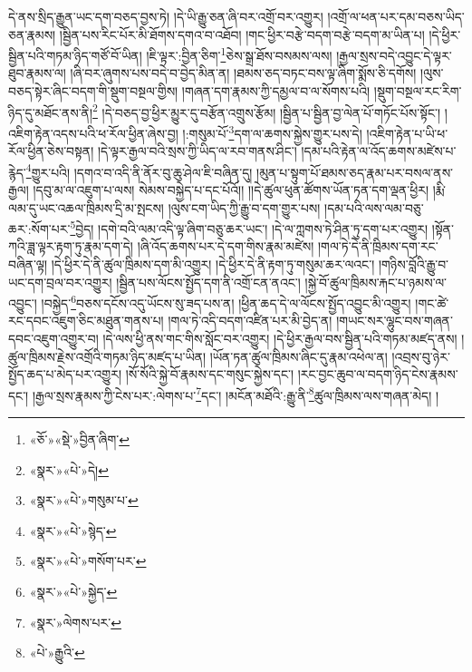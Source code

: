 དེ་ནས་སྲིད་རྒྱུན་ཡང་དག་བཅད་བྱས་ཏེ། །དེ་ཡི་རྒྱུ་ཅན་ཞི་བར་འགྲོ་བར་འགྱུར། །འགྲོ་ལ་ཕན་པར་དམ་བཅས་ཡིད་ཅན་རྣམས། །སྦྱིན་པས་རིང་པོར་མི་ཐོགས་དགའ་བ་འཐོབ། །གང་ཕྱིར་བརྩེ་བདག་བརྩེ་བདག་མ་ཡིན་པ། །དེ་ཕྱིར་སྦྱིན་པའི་གཏམ་ཉིད་གཙོ་བོ་ཡིན། །ཇི་ལྟར་:བྱིན་ཅིག་\footnote{«ཅོ་»«སྡེ་»བྱིན་ཞིག་}ཅེས་སྒྲ་ཐོས་བསམས་ལས། །རྒྱལ་སྲས་བདེ་འབྱུང་དེ་ལྟར་ཐུབ་རྣམས་ལ། །ཞི་བར་ཞུགས་པས་བདེ་བ་བྱེད་མིན་ན། །ཐམས་ཅད་བཏང་བས་ལྟ་ཞིག་སྨོས་ཅི་དགོས། །ལུས་བཅད་སྟེར་ཞིང་བདག་གི་སྡུག་བསྔལ་གྱིས། །གཞན་དག་རྣམས་ཀྱི་དམྱལ་བ་ལ་སོགས་པའི། །སྡུག་བསྔལ་རང་རིག་ཉིད་དུ་མཐོང་ནས་ནི།\footnote{«སྣར་»«པེ་»དེ།} །དེ་བཅད་བྱ་ཕྱིར་མྱུར་དུ་བརྩོན་འགྲུས་རྩོམ། །སྦྱིན་པ་སྦྱིན་བྱ་ལེན་པོ་གཏོང་པོས་སྟོང་། །འཇིག་རྟེན་འདས་པའི་ཕ་རོལ་ཕྱིན་ཞེས་བྱ། །:གསུམ་པོ་\footnote{«སྣར་»«པེ་»གསུམ་པ་}དག་ལ་ཆགས་སྐྱེས་གྱུར་པས་དེ། །འཇིག་རྟེན་པ་ཡི་ཕ་རོལ་ཕྱིན་ཅེས་བསྟན། །དེ་ལྟར་རྒྱལ་བའི་སྲས་ཀྱི་ཡིད་ལ་རབ་གནས་ཤིང་། །དམ་པའི་རྟེན་ལ་འོད་ཆགས་མཛེས་པ་རྙེད་\footnote{«སྣར་»«པེ་»སྙེད་}གྱུར་པའི། །དགའ་བ་འདི་ནི་ནོར་བུ་ཆུ་ཤེལ་ཇི་བཞིན་དུ། །མུན་པ་སྟུག་པོ་ཐམས་ཅད་རྣམ་པར་བསལ་ནས་རྒྱལ། །དབུ་མ་ལ་འཇུག་པ་ལས། སེམས་བསྐྱེད་པ་དང་པོའོ།། །།དེ་ཚུལ་ཕུན་ཚོགས་ཡོན་ཏན་དག་ལྡན་ཕྱིར། །རྨི་ལམ་དུ་ཡང་འཆལ་ཁྲིམས་དྲི་མ་སྤངས། །ལུས་ངག་ཡིད་ཀྱི་རྒྱུ་བ་དག་གྱུར་པས། །དམ་པའི་ལས་ལམ་བཅུ་ཆར་:སོག་པར་\footnote{«སྣར་»«པེ་»གསོག་པར་}བྱེད། །དགེ་བའི་ལམ་འདི་ལྟ་ཞིག་བཅུ་ཆར་ཡང་། །དེ་ལ་ཀླགས་ཏེ་ཤིན་ཏུ་དག་པར་འགྱུར། །སྟོན་ཀའི་ཟླ་ལྟར་རྟག་ཏུ་རྣམ་དག་དེ། །ཞི་འོད་ཆགས་པར་དེ་དག་གིས་རྣམ་མཛེས། །གལ་ཏེ་དེ་ནི་ཁྲིམས་དག་རང་བཞིན་ལྟ། །དེ་ཕྱིར་དེ་ནི་ཚུལ་ཁྲིམས་དག་མི་འགྱུར། །དེ་ཕྱིར་དེ་ནི་རྟག་ཏུ་གསུམ་ཆར་ལའང་། །གཉིས་བློའི་རྒྱུ་བ་ཡང་དག་བྲལ་བར་འགྱུར། །སྦྱིན་པས་ལོངས་སྤྱོད་དག་ནི་འགྲོ་ངན་ནའང་། །སྐྱེ་བོ་ཚུལ་ཁྲིམས་རྐང་པ་ཉམས་ལ་འབྱུང་། །བསྐྱེད་\footnote{«སྣར་»«པེ་»སྐྱེད་}བཅས་དངོས་འདུ་ཡོངས་སུ་ཟད་པས་ན། །ཕྱིན་ཆད་དེ་ལ་ལོངས་སྤྱོད་འབྱུང་མི་འགྱུར། །གང་ཚེ་རང་དབང་འཇུག་ཅིང་མཐུན་གནས་པ། །གལ་ཏེ་འདི་བདག་འཛིན་པར་མི་བྱེད་ན། །གཡང་སར་ལྷུང་བས་གཞན་དབང་འཇུག་འགྱུར་བ། །དེ་ལས་ཕྱི་ནས་གང་གིས་སློང་བར་འགྱུར། །དེ་ཕྱིར་རྒྱལ་བས་སྦྱིན་པའི་གཏམ་མཛད་ནས། །ཚུལ་ཁྲིམས་རྗེས་འགྲོའི་གཏམ་ཉིད་མཛད་པ་ཡིན། །ཡོན་ཏན་ཚུལ་ཁྲིམས་ཞིང་དུ་རྣམ་འཕེལ་ན། །འབྲས་བུ་ཉེར་སྤྱོད་ཆད་པ་མེད་པར་འགྱུར། །སོ་སོའི་སྐྱེ་བོ་རྣམས་དང་གསུང་སྐྱེས་དང་། །རང་བྱང་ཆུབ་ལ་བདག་ཉིད་ངེས་རྣམས་དང་། །རྒྱལ་སྲས་རྣམས་ཀྱི་ངེས་པར་:ལེགས་པ་\footnote{«སྣར་»ལེགས་པར་}དང་། །མངོན་མཐོའི་:རྒྱུ་ནི་\footnote{«པེ་»རྒྱུའི་}ཚུལ་ཁྲིམས་ལས་གཞན་མེད། །
